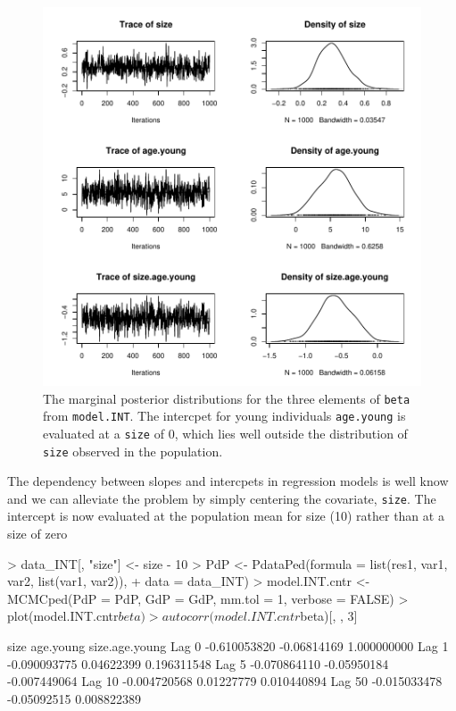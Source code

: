 \documentclass{article}
\begin{document}
\begin{figure}[!h]
\begin{center}
\includegraphics{Tutorial-057}
\end{center}
\caption{The marginal posterior distributions for the three elements of \texttt{beta} from \texttt{model.INT}.  The intercpet for young individuals \texttt{age.young} is evaluated at a \texttt{size} of 0, which lies well outside the distribution of \texttt{size} observed in the population.}
\label{INT-fig}
\end{figure}

The dependency between slopes and intercpets in regression models is well know and we can alleviate the problem by simply centering the covariate, \texttt{size}.  The intercept is now evaluated at the population mean for size (10) rather than at a size of zero

\begin{Schunk}
\begin{Sinput}
> data_INT[, "size"] <- size - 10
> PdP <- PdataPed(formula = list(res1, var1, var2, list(var1, var2)), 
+     data = data_INT)
> model.INT.cntr <- MCMCped(PdP = PdP, GdP = GdP, mm.tol = 1, verbose = FALSE)
> plot(model.INT.cntr$beta)
> autocorr(model.INT.cntr$beta)[, , 3]
\end{Sinput}
\begin{Soutput}
               size   age.young size.age.young
Lag 0  -0.610053820 -0.06814169    1.000000000
Lag 1  -0.090093775  0.04622399    0.196311548
Lag 5  -0.070864110 -0.05950184   -0.007449064
Lag 10 -0.004720568  0.01227779    0.010440894
Lag 50 -0.015033478 -0.05092515    0.008822389
\end{Soutput}
\end{Schunk}
\end{document}
